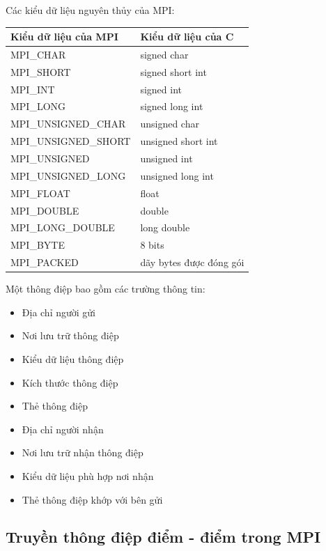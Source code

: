 \documentclass[14pt, a4paper]{article}
\numberwithin{equation}{section}
\numberwithin{figure}{section}
\numberwithin{dl}{section}
\numberwithin{md}{section}
\numberwithin{bd}{section}
\numberwithin{dn}{section}
\numberwithin{hq}{section}
\begin{document}
Các kiểu dữ liệu nguyên thủy của MPI:

\begin{table}[H]
    \centering
    \begin{tabular}{ll}
        \hline
        Kiểu dữ liệu của MPI & Kiểu dữ liệu của C \\
        \hline
        MPI\_CHAR & signed char \\
        MPI\_SHORT & signed short int \\
        MPI\_INT & signed int \\
        MPI\_LONG & signed long int \\
        MPI\_UNSIGNED\_CHAR & unsigned char \\
        MPI\_UNSIGNED\_SHORT & unsigned short int \\
        MPI\_UNSIGNED & unsigned int \\
        MPI\_UNSIGNED\_LONG & unsigned long int \\
        MPI\_FLOAT & float \\
        MPI\_DOUBLE & double \\
        MPI\_LONG\_DOUBLE & long double \\
        MPI\_BYTE & 8 bits \\
        MPI\_PACKED & dãy bytes được đóng gói \\
        \hline
    \end{tabular}
\end{table}

Một thông điệp bao gồm các trường thông tin:
\begin{itemize}
    \item Địa chỉ người gửi
    \item Nơi lưu trữ thông điệp
    \item Kiểu dữ liệu thông điệp
    \item Kích thước thông điệp
    \item Thẻ thông điệp
    \item Địa chỉ người nhận 
    \item Nơi lưu trữ nhận thông điệp
    \item Kiểu dữ liệu phù hợp nơi nhận 
    \item Thẻ thông điệp khớp với bên gửi
\end{itemize}

\subsection{Truyền thông điệp điểm - điểm trong MPI}
\end{document}

